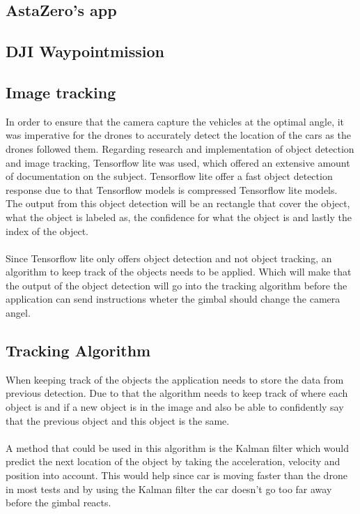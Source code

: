 \subsection{AstaZero's app} \label{AZ's app}
\subsection{DJI Waypointmission}



\subsection{Image tracking} \label{Image tracking}
In order to ensure that the camera capture the vehicles at the optimal angle, it was imperative for the drones to accurately detect the location of the cars as the drones followed them. Regarding research and implementation of object detection and image tracking, Tensorflow lite was used, which offered an extensive amount of documentation on the subject. Tensorflow lite offer a fast object detection response due to that Tensorflow models is compressed Tensorflow lite models. The output from this object detection will be an rectangle that cover the object, what the object is labeled as, the confidence for what the object is and lastly the index of the object.
\\ \\
Since Tensorflow lite only offers object detection and not object tracking, an algorithm to keep track of the objects needs to be applied. Which will make that the output of the object detection will go into the tracking algorithm before the application can send instructions wheter the gimbal should change the camera angel.

\subsection{Tracking Algorithm} \label{Tracking algorithm}
When keeping track of the objects the application needs to store the data from previous detection. Due to that the algorithm needs to keep track of where each object is and if a new object is in the image and also be able to confidently say that the previous object and this object is the same. 
\\ \\
A method that could be used in this algorithm is the Kalman filter  which would predict the next location of the object by taking the acceleration, velocity and position into account. This would help since car is moving faster than the drone in most tests and by using the Kalman filter the car doesn't go too far away before the gimbal reacts.


